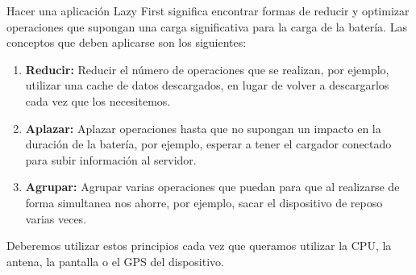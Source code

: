 
Hacer una aplicación Lazy First significa encontrar formas de reducir y optimizar operaciones que supongan una carga significativa para la carga de la batería. Las conceptos que deben aplicarse son los siguientes:
\begin{enumerate}
\item \textbf{Reducir:} Reducir el número de operaciones que se realizan, por ejemplo, utilizar una cache de datos descargados, en lugar de volver a descargarlos cada vez que los necesitemos.
\item \textbf{Aplazar:} Aplazar operaciones hasta que no supongan un impacto en la duración de la batería, por ejemplo, esperar a tener el cargador conectado para subir información al servidor.
\item \textbf{Agrupar:} Agrupar varias operaciones que puedan para que al realizarse de forma simultanea nos ahorre, por ejemplo, sacar el dispositivo de reposo varias veces.
\end{enumerate}

Deberemos utilizar estos principios cada vez que queramos utilizar la CPU, la antena, la pantalla o el GPS del dispositivo.